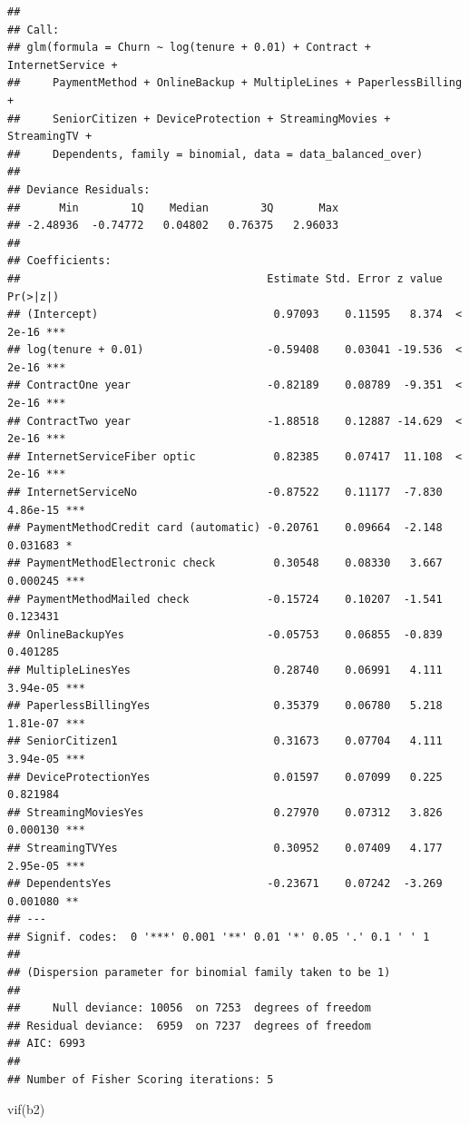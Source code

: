 \documentclass[
  twoside]{article}
\newenvironment{Shaded}{\begin{snugshade}}{\end{snugshade}}
\newcommand{\FunctionTok}[1]{\textcolor[rgb]{0.00,0.00,0.00}{#1}}
\newcommand{\NormalTok}[1]{#1}
\begin{document}
\begin{verbatim}
## 
## Call:
## glm(formula = Churn ~ log(tenure + 0.01) + Contract + InternetService + 
##     PaymentMethod + OnlineBackup + MultipleLines + PaperlessBilling + 
##     SeniorCitizen + DeviceProtection + StreamingMovies + StreamingTV + 
##     Dependents, family = binomial, data = data_balanced_over)
## 
## Deviance Residuals: 
##      Min        1Q    Median        3Q       Max  
## -2.48936  -0.74772   0.04802   0.76375   2.96033  
## 
## Coefficients:
##                                      Estimate Std. Error z value Pr(>|z|)    
## (Intercept)                           0.97093    0.11595   8.374  < 2e-16 ***
## log(tenure + 0.01)                   -0.59408    0.03041 -19.536  < 2e-16 ***
## ContractOne year                     -0.82189    0.08789  -9.351  < 2e-16 ***
## ContractTwo year                     -1.88518    0.12887 -14.629  < 2e-16 ***
## InternetServiceFiber optic            0.82385    0.07417  11.108  < 2e-16 ***
## InternetServiceNo                    -0.87522    0.11177  -7.830 4.86e-15 ***
## PaymentMethodCredit card (automatic) -0.20761    0.09664  -2.148 0.031683 *  
## PaymentMethodElectronic check         0.30548    0.08330   3.667 0.000245 ***
## PaymentMethodMailed check            -0.15724    0.10207  -1.541 0.123431    
## OnlineBackupYes                      -0.05753    0.06855  -0.839 0.401285    
## MultipleLinesYes                      0.28740    0.06991   4.111 3.94e-05 ***
## PaperlessBillingYes                   0.35379    0.06780   5.218 1.81e-07 ***
## SeniorCitizen1                        0.31673    0.07704   4.111 3.94e-05 ***
## DeviceProtectionYes                   0.01597    0.07099   0.225 0.821984    
## StreamingMoviesYes                    0.27970    0.07312   3.826 0.000130 ***
## StreamingTVYes                        0.30952    0.07409   4.177 2.95e-05 ***
## DependentsYes                        -0.23671    0.07242  -3.269 0.001080 ** 
## ---
## Signif. codes:  0 '***' 0.001 '**' 0.01 '*' 0.05 '.' 0.1 ' ' 1
## 
## (Dispersion parameter for binomial family taken to be 1)
## 
##     Null deviance: 10056  on 7253  degrees of freedom
## Residual deviance:  6959  on 7237  degrees of freedom
## AIC: 6993
## 
## Number of Fisher Scoring iterations: 5
\end{verbatim}

\begin{Shaded}
\begin{Highlighting}[]
\FunctionTok{vif}\NormalTok{(b2)}
\end{Highlighting}
\end{Shaded}
\end{document}
